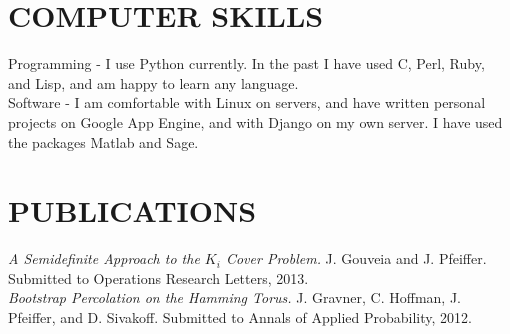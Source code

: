 \documentclass{res}
\begin{document}
\begin{resume}
\section{COMPUTER SKILLS}          
    Programming - I use Python currently. In the past I have used C, Perl, Ruby, and Lisp, and am happy to learn any language. \\
	Software - I am comfortable with Linux on servers, and have written personal projects on Google App Engine, and with Django on my own server. I have used the packages Matlab and Sage.


\section{PUBLICATIONS}
{\em A Semidefinite Approach to the $K_i$ Cover Problem.} J. Gouveia and J. Pfeiffer. Submitted to Operations Research Letters, 2013.\\
{\em Bootstrap Percolation on the Hamming Torus.} J. Gravner, C. Hoffman, J. Pfeiffer, and D. Sivakoff. Submitted to Annals of Applied Probability, 2012.




 
 
  
 
\end{resume}
\end{document}
